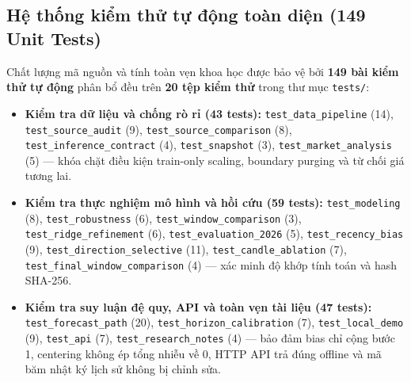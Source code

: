 \documentclass[12pt,a4paper]{report}
\begin{document}
\subsection{Hệ thống kiểm thử tự động toàn diện (149 Unit Tests)}
Chất lượng mã nguồn và tính toàn vẹn khoa học được bảo vệ bởi \textbf{149 bài kiểm thử tự động} phân bổ đều trên \textbf{20 tệp kiểm thử} trong thư mục \texttt{tests/}:
\begin{itemize}
    \raggedright
    \item \textbf{Kiểm tra dữ liệu và chống rò rỉ (43 tests):} \nolinkurl{test_data_pipeline} (14), \nolinkurl{test_source_audit} (9), \nolinkurl{test_source_comparison} (8), \nolinkurl{test_inference_contract} (4), \nolinkurl{test_snapshot} (3), \nolinkurl{test_market_analysis} (5) — khóa chặt điều kiện train-only scaling, boundary purging và từ chối giá tương lai.
    \item \textbf{Kiểm tra thực nghiệm mô hình và hồi cứu (59 tests):} \nolinkurl{test_modeling} (8), \nolinkurl{test_robustness} (6), \nolinkurl{test_window_comparison} (3), \nolinkurl{test_ridge_refinement} (6), \nolinkurl{test_evaluation_2026} (5), \nolinkurl{test_recency_bias} (9), \nolinkurl{test_direction_selective} (11), \nolinkurl{test_candle_ablation} (7), \nolinkurl{test_final_window_comparison} (4) — xác minh độ khớp tính toán và hash SHA-256.
    \item \textbf{Kiểm tra suy luận đệ quy, API và toàn vẹn tài liệu (47 tests):} \nolinkurl{test_forecast_path} (20), \nolinkurl{test_horizon_calibration} (7), \nolinkurl{test_local_demo} (9), \texttt{test\_api} (7), \nolinkurl{test_research_notes} (4) — bảo đảm bias chỉ cộng bước 1, centering không ép tổng nhiễu về 0, HTTP API trả đúng offline và mã băm nhật ký lịch sử không bị chỉnh sửa.
\end{itemize}
\end{document}
